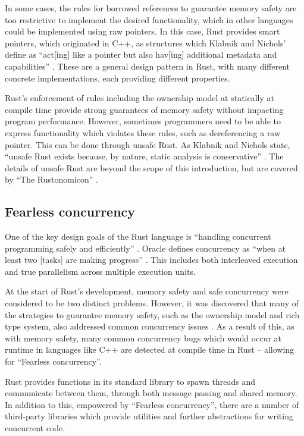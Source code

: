 In some cases, the rules for borrowed references to guarantee memory safety are too restrictive to implement the desired functionality, which in other languages could be implemented using raw pointers. In this case, Rust provides smart pointers, which originated in C++, as structures which Klabnik and Nichols' define as ``act[ing] like a pointer but also hav[ing] additional metadata and capabilities'' \cite{RustProgrammingLanguage}. These are a general design pattern in Rust, with many different concrete implementations, each providing different properties.

Rust's enforcement of rules including the ownership model at statically at compile time provide strong guarantees of memory safety without impacting program performance. However, sometimes programmers need to be able to express functionality which violates these rules, such as dereferencing a raw pointer. This can be done through unsafe Rust. As Klabnik and Nichols state, ``unsafe Rust exists because, by nature, static analysis is conservative'' \cite{RustProgrammingLanguage}. The details of unsafe Rust are beyond the scope of this introduction, but are covered by ``The Rustonomicon''  \cite{IntroductionRustonomicon}.

\subsection{Fearless concurrency}
\label{ssec:rust-fearless-concurrency}

One of the key design goals of the Rust language is ``handling concurrent programming safely and efficiently'' \cite{RustProgrammingLanguage}. Oracle defines concurrency as ``when at least two [tasks] are making progress'' \cite{DefiningMultithreadingTerms}. This includes both interleaved execution and true parallelism across multiple execution units.

At the start of Rust's development, memory safety and safe concurrency were considered to be two distinct problems. However, it was discovered that many of the strategies to guarantee memory safety, such as the ownership model and rich type system, also addressed common concurrency issues \cite{FearlessConcurrencyRust}. As a result of this, as with memory safety, many common concurrency bugs which would occur at runtime in languages like C++ are detected at compile time in Rust -- allowing for ``Fearless concurrency''.

Rust provides functions in its standard library to spawn threads and communicate between them, through both message passing and shared memory. In addition to this, empowered by ``Fearless concurrency'', there are a number of third-party libraries which provide utilities and further abstractions for writing concurrent code.

